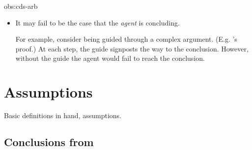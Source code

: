 \begin{note}
\begin{motivation}{obs:cds-arb}
\begin{itemize}
      For example, there are exactly five intermediate logics that have the interpolation property (\cite[cf.][]{Maksimova:1977un}).
      However, \citeauthor{Maksimova:1977un} may have been ready to give up on the proof at any point.%
      \footnote{%
        Though, admittedly, it is unlikely \citeauthor{Maksimova:1977un} would have given up.
      }
    \item
      It may fail to be the case that the \emph{agent} is concluding.

      For example, consider being guided through a complex argument.
      (E.g. \citeauthor{Maksimova:1977un}'s proof.)
      At each step, the guide signposts the way to the conclusion.
      However, without the guide the agent would fail to reach the conclusion.
    \end{itemize}
    \vspace{-\baselineskip}
  \end{motivation}
\end{note}


\section{Assumptions}
\label{sec:assumptions}

\begin{note}
  Basic definitions in hand, assumptions.
\end{note}

\subsection{Conclusions from }
\label{sec:pools-premises}

